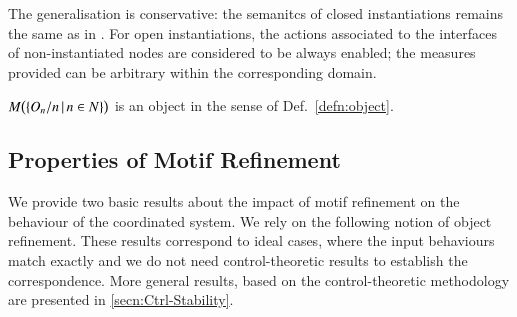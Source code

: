 \documentclass[runningheads]{llncs}
\newcommand{\secn}[1]{\cref{secn:#1}}
\newcommand{\defn}[1]{Def.~\ref{defn:#1}}
\newcommand{\setdef}[2]{\{#1\,|\,#2\}}
\newcommand{\motif}[1][]{M\ifx#1\relax\else^{#1}\fi}
\newcommand{\object}[1][]{O\ifx#1\relax\else^{#1}\fi}
\begin{document}
The generalisation is conservative: the semanitcs of closed instantiations remains the same as in \cite{BCK26-Motifs}.  For open instantiations, the actions associated to the interfaces of non-instantiated nodes are considered to be always enabled; the measures provided can be arbitrary within the corresponding domain.

\begin{proposition}
  \label{prop:semantics:correct}
  $\motif\bigl(\setdef{\object_n/n}{n \in N}\bigr)$ is an object in the sense of \defn{object}.
\end{proposition}

\subsection{Properties of Motif Refinement}
\label{secn:refinement:props}

We provide two basic results about the impact of motif refinement on the behaviour of the coordinated system.  We rely on the following notion of object refinement.  These results correspond to ideal cases, where the input behaviours match exactly and we do not need control-theoretic results to establish the correspondence.  More general results, based on the control-theoretic methodology are presented in \secn{Ctrl-Stability}.
\end{document}
